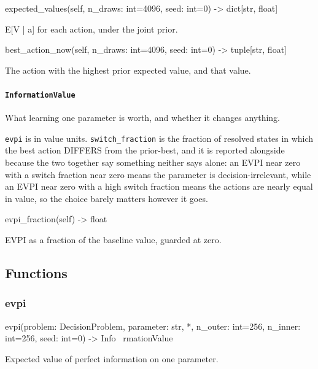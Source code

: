 \documentclass[10pt,a4paper,twoside]{report}
\begin{document}
\begin{verbatimsmall}
expected_values(self, n_draws: int=4096, seed: int=0) -> dict[str, float]
\end{verbatimsmall}

E[V | a] for each action, under the joint prior.

\begin{verbatimsmall}
best_action_now(self, n_draws: int=4096, seed: int=0) -> tuple[str, float]
\end{verbatimsmall}

The action with the highest prior expected value, and that value.

\paragraph{\texttt{InformationValue}}

What learning one parameter is worth, and whether it changes anything.

\texttt{evpi} is in value units. \texttt{switch\_fraction} is the fraction of resolved states in which the best action DIFFERS from the prior-best, and it is reported alongside because the two together say something neither says alone: an EVPI near zero with a switch fraction near zero means the parameter is decision-irrelevant, while an EVPI near zero with a high switch fraction means the actions are nearly equal in value, so the choice barely matters however it goes.

\begin{verbatimsmall}
evpi_fraction(self) -> float
\end{verbatimsmall}

EVPI as a fraction of the baseline value, guarded at zero.

\subsection*{Functions}

\subsubsection*{evpi}

\begin{verbatimsmall}
evpi(problem: DecisionProblem, parameter: str, *, n_outer: int=256, n_inner: int=256, seed: int=0) -> Info
    \ rmationValue
\end{verbatimsmall}

Expected value of perfect information on one parameter.
\end{document}
